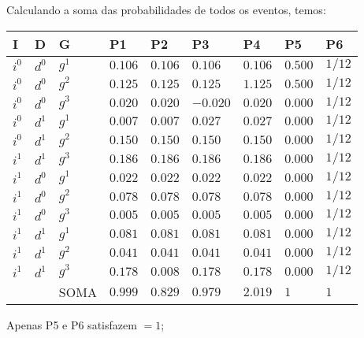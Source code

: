 \item

Calculando a soma das probabilidades de todos os eventos, temos:

\begin{tabular}{|l|l|l|l|l|l|l|l|l|}
\hline
I & D & G & P1 & P2 & P3 & P4 & P5 & P6 \\ \hline
$i^0$ & $d^0$ & $g^1$ & $0.106$ & $0.106$ & $0.106$ & $0.106$ & $0.500$ & $1/12$ \\ \hline
$i^0$ & $d^0$ & $g^2$ & $0.125$ & $0.125$ & $0.125$ & $1.125$ & $0.500$ & $1/12$ \\ \hline
$i^0$ & $d^0$ & $g^3$ & $0.020$ & $0.020$ & $-0.020$ & $0.020$ & $0.000$ & $1/12$ \\ \hline
$i^0$ & $d^1$ & $g^1$ & $0.007$ & $0.007$ & $0.027$ & $0.027$ & $0.000$ & $1/12$ \\ \hline
$i^0$ & $d^1$ & $g^2$ & $0.150$ & $0.150$ & $0.150$ & $0.150$ & $0.000$ & $1/12$ \\ \hline
$i^1$ & $d^1$ & $g^3$ & $0.186$ & $0.186$ & $0.186$ & $0.186$ & $0.000$ & $1/12$ \\ \hline
$i^1$ & $d^0$ & $g^1$ & $0.022$ & $0.022$ & $0.022$ & $0.022$ & $0.000$ & $1/12$ \\ \hline
$i^1$ & $d^0$ & $g^2$ & $0.078$ & $0.078$ & $0.078$ & $0.078$ & $0.000$ & $1/12$ \\ \hline
$i^1$ & $d^0$ & $g^3$ & $0.005$ & $0.005$ & $0.005$ & $0.005$ & $0.000$ & $1/12$ \\ \hline
$i^1$ & $d^1$ & $g^1$ & $0.081$ & $0.081$ & $0.081$ & $0.081$ & $0.000$ & $1/12$ \\ \hline
$i^1$ & $d^1$ & $g^2$ & $0.041$ & $0.041$ & $0.041$ & $0.041$ & $0.000$ & $1/12$ \\ \hline
$i^1$ & $d^1$ & $g^3$ & $0.178$ & $0.008$ & $0.178$ & $0.178$ & $0.000$ & $1/12$ \\ \hline
 &  & SOMA & $0.999$ & $0.829$ & $0.979$ & $2.019$ & $1$ & $1$ \\ \hline
\end{tabular}

Apenas P5 e P6 satisfazem $= 1$;

